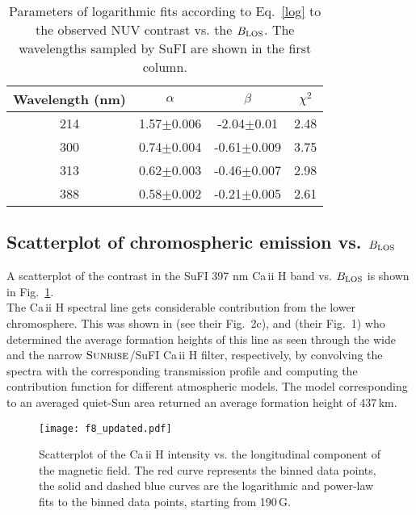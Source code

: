 \documentclass[goettingen, gauss, print]{thesis}
\begin{document}
\begin{table}[h!]
\centering
\caption{Parameters of logarithmic fits according to Eq.~\ref{log} to the observed NUV contrast vs. the $B_{\rm LOS}$. The wavelengths sampled by SuFI are shown in the first column.}
\begin{tabular}{||cccc||}
\hline
Wavelength (nm)& $\alpha$ & $\beta$ & $\chi^2$ \\
\hline\hline
214 & 1.57$\pm$0.006 & -2.04$\pm$0.01&2.48 \\
300 & 0.74$\pm$0.004&-0.61$\pm$0.009&3.75 \\
313&0.62$\pm$0.003&-0.46$\pm$0.007&2.98 \\
388&0.58$\pm$0.002&-0.21$\pm$0.005&2.61 \\
\hline
\end{tabular}
\label{uv_log}
\end{table}

\subsection{Scatterplot of chromospheric emission vs. $B_{\rm LOS}$}
\label{scatter_ca}
A scatterplot of the contrast in the SuFI 397 nm Ca\,{\sc ii} H band vs. $B_{\rm LOS}$ is shown in Fig.~\ref{b_ca}.\\
The Ca\,{\sc ii} H spectral line gets considerable contribution from the lower chromosphere. This was shown in \citet{jafarzadeh_structure_2013}(see their Fig.~2c), and \cite{danilovic_comparison_2014} (their Fig.~1) who determined the average formation heights of this line as seen through the wide and the narrow $\textsc{Sunrise}$/SuFI Ca\,{\sc ii} H filter, respectively, by convolving the spectra with the corresponding transmission profile and computing the contribution function for different atmospheric models. The model corresponding to an averaged quiet-Sun area returned an average formation height of 437\,km. 


\begin{figure}
\centering
\texttt{[image: f8\_updated.pdf]}
\caption{Scatterplot of the Ca\,{\sc ii} H intensity vs. the longitudinal component of the magnetic field. The red curve represents the binned data points, the solid and dashed blue curves are the logarithmic and power-law fits to the binned data points, starting from 190\,G.}
\label{b_ca}
\end{figure}
\end{document}
